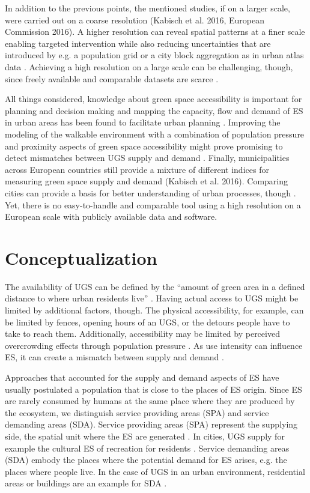 \documentclass[10pt]{article}
\begin{document}
In addition to the previous points, the mentioned studies, if on a larger scale, were carried out on a coarse resolution (Kabisch et al. 2016, European Commission 2016).
A higher resolution can reveal spatial patterns at a finer scale enabling targeted intervention while also reducing uncertainties that are introduced by e.g. a population grid or a city block aggregation as in urban atlas data \citep{Barthelemy.2018, Esch.2014}.
Achieving a high resolution on a large scale can be challenging, though, since freely available and comparable datasets are scarce \citep{Feltynowski.2018, Dworczyk.2021}.

All things considered, knowledge about green space accessibility is important for planning and decision making and mapping the capacity, flow and demand of ES in urban areas has been found to facilitate urban planning \citep{Baro.2016}.
Improving the modeling of the walkable environment with a combination of population pressure and proximity aspects of green space accessibility might prove promising to detect mismatches between UGS supply and demand \citep{Biernacka.2019, Biernacka.2020}.
Finally, municipalities across European countries still provide a mixture of different indices for measuring green space supply and demand (Kabisch et al. 2016).
Comparing cities can provide a basis for better understanding of urban processes, though \citep{Wolff.2020}.
Yet, there is no easy-to-handle and comparable tool using a high resolution on a European scale with publicly available data and software.


\section{Conceptualization}
The availability of UGS can be defined by the “amount of green area in a defined distance to where urban residents live” \citep{Kabisch.2016}.
Having actual access to UGS might be limited by additional factors, though. 
The physical accessibility, for example, can be limited by fences, opening hours of an UGS, or the detours people have to take to reach them. 
Additionally, accessibility may be limited by perceived overcrowding effects through population pressure \citep{Kabisch.2016, Wolff.2020b}.
As use intensity can influence ES, it can create a mismatch between supply and demand \citep{Syrbe.2017}. 

Approaches that accounted for the supply and demand aspects of ES have usually postulated a population that is close to the places of ES origin. 
Since ES are rarely consumed by humans at the same place where they are produced by the ecosystem, we distinguish service providing areas (SPA) and service demanding areas (SDA). 
Service providing areas (SPA) represent the supplying side, the spatial unit where the ES are generated \citep{Syrbe.2012, Dworczyk.2021}.
In cities, UGS supply for example the cultural ES of recreation for residents \citep{Dickinson.2017}.
Service demanding areas (SDA) embody the places where the potential demand for ES arises, e.g. the places where people live. In the case of UGS in an urban environment, residential areas or buildings are an example for SDA \citep{Dworczyk.2021}.
\end{document}
